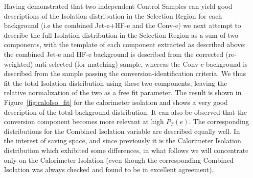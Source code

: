 Having demonstrated that two independent Control Samples can yield good descriptions of the Isolation distribution in the Selection Region for each background (i.e the combined Jet-e+HF-e and the Conv-e) we next attempt to describe the full Isolation distribution in the Selection Region as a sum of two components, with the template of each component extracted as described above: the combined Jet-e and HF-e background is described from the corrected (re-weighted) anti-selected (for matching) sample, whereas the Conv-e background is described from the sample passing the conversion-identification criteria.  We thus fit the total Isolation distribution using these two components, leaving the relative normalization of the two as a free fit parameter.  The result is shown in Figure~\ref{fig:caloIso_fit} for the calorimeter isolation and shows a very good description of the total background distribution.  It can also be observed that the conversion component becomes more relevant at high $P_T(e)$.  The corresponding distributions for the Combined Isolation variable are described equally well.  In the interest of saving space, and since previously it is the Calorimeter Isolation distribution which exhibited some differences, in what follows we will concentrate only on the Calorimeter Isolation (even though the corresponding Combined Isolation was always checked and found to be in excellent agreement).

